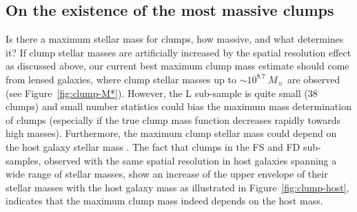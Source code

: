 \documentclass[twocolumn]{aastex61}
\begin{document}

%

\subsection{On the existence of the most massive clumps}
\label{sect:max}

Is there a maximum stellar mass for clumps, how massive, and what determines 
it? If clump stellar masses are artificially increased by the spatial 
resolution effect 
as discussed above, our current best maximum clump mass estimate should come 
from lensed galaxies, where clump stellar masses up to $\sim 10^{8.7}~M_{\sun}$ 
are observed (see Figure~\ref{fig:clump-M*}). However, the L sub-sample is quite 
small (38 clumps) and small number statistics could bias the maximum mass 
determination of clumps (especially if the true clump mass function decreases 
rapidly towards high masses). Furthermore, the maximum clump stellar mass could 
depend on the host galaxy stellar mass 
\citep[see][]{elmegreen13}. 
The fact that clumps in the FS and FD sub-samples, observed with the same 
spatial resolution in host galaxies spanning a wide range of stellar masses, 
show an increase of the upper envelope of their stellar masses with the host 
galaxy mass as illustrated in Figure~\ref{fig:clump-host}, indicates that the 
maximum clump mass indeed depends on the host mass. 
\end{document}
